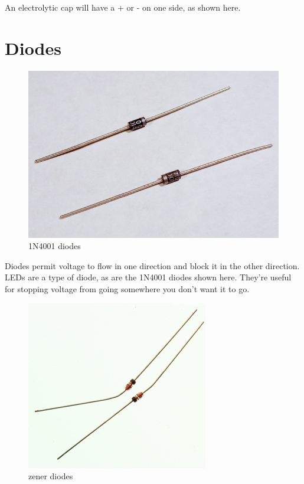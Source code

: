 An electrolytic cap will have a + or - on one side, as shown here. 

\section{Diodes}

\begin{figure}[!htb]
     \centering
     \includegraphics[scale=0.3]{img/components/diodes_400x.jpg}
     \caption{1N4001 diodes}
     \label{1N4001 diodes}
\end{figure}

Diodes permit voltage to flow in one direction and block it in the other direction. LEDs are a type of diode, as are the 1N4001 diodes shown here. They're useful for stopping voltage from going somewhere you don't want it to go. 

\begin{figure}[!htb]
     \centering
     \includegraphics[scale=0.3]{img/components/diodes_zener.jpg}
     \caption{zener diodes}
     \label{zener diodes}
\end{figure}


